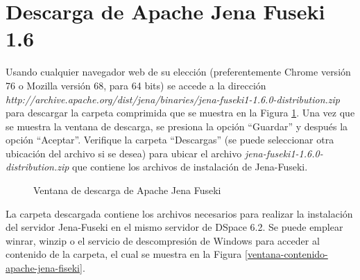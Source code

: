 \section{Descarga de Apache Jena Fuseki 1.6}

Usando cualquier navegador web de su elección (preferentemente Chrome versión 76 o Mozilla versión 68, para 64 bits) se accede a la dirección \textit{http://archive.apache.org/dist/jena/binaries/jena-fuseki1-1.6.0-distribution.zip} para descargar la carpeta comprimida que se muestra en la Figura \ref{ventana-descarga-apache-jena-fiseki}. Una vez que se muestra la ventana de descarga, se presiona la opción “Guardar” y después la opción “Aceptar”. Verifique la carpeta “Descargas” (se puede seleccionar otra ubicación del archivo si se desea) para ubicar el archivo \textit{jena-fuseki1-1.6.0-distribution.zip} que contiene los archivos de instalación de Jena-Fuseki.

\begin{figure}[!ht]
	\centering
    \caption{Ventana de descarga de Apache Jena Fuseki}
    \label{ventana-descarga-apache-jena-fiseki}
\end{figure}

La carpeta descargada contiene los archivos necesarios para realizar la instalación del servidor Jena-Fuseki en el mismo servidor de DSpace 6.2. Se puede emplear winrar, winzip o el servicio de descompresión de Windows para acceder al contenido de la carpeta, el cual se muestra en la Figura \ref{ventana-contenido-apache-jena-fiseki}.

